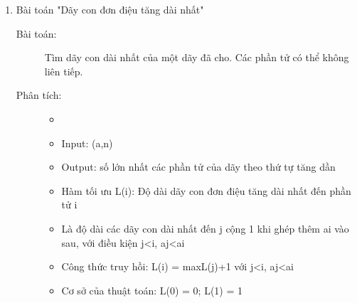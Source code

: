 \begin{enumerate}
    \item Bài toán "Dãy con đơn điệu tăng dài nhất"
    \begin{description}
        \item[Bài toán:] Tìm dãy con dài nhất của một dãy đã cho. Các phần tử có thể không liên tiếp.
        \item[Phân tích:]
            \begin{itemize}
                \item[]
                \item Input: (a,n)
                \item Output: số lớn nhất các phần tử của dãy theo thứ tự tăng dần
                \item Hàm tối ưu L(i): Độ dài dãy con đơn điệu tăng dài nhất đến phần tử i
                \item[]Là độ dài các dãy con dài nhất đến j cộng 1 khi ghép thêm ai vào sau, với
                điều kiện j<i, aj<ai
                \item Công thức truy hồi: L(i) = max{L(j)}+1 với j<i, aj<ai
                \item Cơ sở của thuật toán: L(0) = 0; L(1) = 1
            \end{itemize}
        

\end{description}
\end{enumerate}
